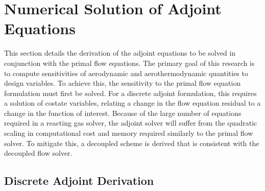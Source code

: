 \chapter{Numerical Solution of Adjoint Equations}
\label{chapter-four}

This section details the derivation of the adjoint equations to be solved in
conjunction with the primal flow equations.  The primary goal of this research is
to compute sensitivities of aerodynamic and aerothermodynamic quantities to
design variables.  To achieve this, the sensitivity to the primal flow equation
formulation must first be solved.  For a discrete adjoint formulation, this
requires a solution of costate variables, relating a change in the flow equation
residual to a change in the function of interest.  Because of the large number
of equations required in a reacting gas solver, the adjoint solver will suffer
from the quadratic scaling in computational cost and memory required similarly
to the primal flow solver.  To mitigate this, a decoupled scheme is derived that
is consistent with the decoupled flow solver.

\section{Discrete Adjoint Derivation}

